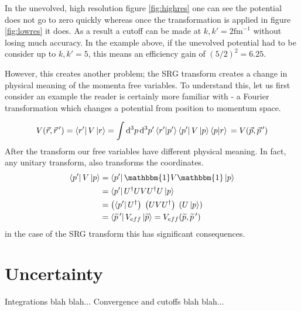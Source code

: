 \documentclass[a4paper,11pt]{article}
\newcommand{\dd}{\mathrm{d}}
\newcommand{\br}[1]{\left\langle #1 \right |}
\newcommand{\kt}[1]{\left| #1 \right \rangle}
\newcommand{\brkt}[2]{\left \langle #1 |#2 \right \rangle}
\begin{document}
In the unevolved, high resolution figure \ref{fig:highres} one can see the potential does not go to zero quickly whereas once the transformation is applied in figure \ref{fig:lowres} it does. As a result a cutoff can be made at $k,k'=2 \mathrm{fm}^{-1}$ without losing much accuracy. In the example above, if the unevolved potential had to be consider up to $k,k'=5$, this means an efficiency gain of $(5/2)^2=6.25$.

However, this creates another problem; the SRG transform creates a change in physical meaning of the momenta free variables.
To understand this, let us first consider an example the reader is certainly more familiar with - a Fourier transformation which changes a potential from position to momentum space.

\begin{equation}
    V(\vec{r},\vec{r}\,')= \br{r'} V \kt{r}=
                          \int \dd^3p\, \dd^3p' \brkt{r'}{p'} \br{p'}V\kt{p} \brkt{p}{r}\\
                          =V(\vec{p},\vec{p}\,')
\end{equation}
After the transform our free variables have different physical meaning. In fact, any unitary transform, also transforms the coordinates.
\begin{align}
    \br{p'}V\kt{p} &= \br{p'} \mathbbm{1} V \mathbbm{1} \kt{p}\nonumber\\
                   &= \br{p'} U^\dag U V U^\dag U \kt{p}\nonumber\\
                   &= \left(\br{p'} U^\dag\right)\;\left( U V U^\dag\right)\;\left( U \kt{p}\right)\\
                   &= \br{\widetilde{p}\,'} V_{eff} \kt{\widetilde{p}}=V_{eff}(\widetilde{p},\widetilde{p}\,')\nonumber
\end{align}
in the case of the SRG transform this has significant consequences.
\section{Uncertainty}
Integrations blah blah... Convergence and cutoffs blah blah...
\end{document}
